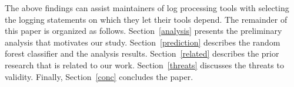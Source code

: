 The above findings can assist maintainers of log processing tools with selecting the logging statements on which they let their tools depend. %
%
%
%
%
%
%
%
%
% 
The remainder of this paper is organized as follows. Section~\ref{analysis} presents the preliminary analysis that motivates our study. Section~\ref{prediction} describes the random forest classifier and the analysis results. Section~\ref{related} describes the prior research that is related to our work. Section~\ref{threats} discusses the threats to validity. Finally, Section~\ref{conc} concludes the paper.
 
 
